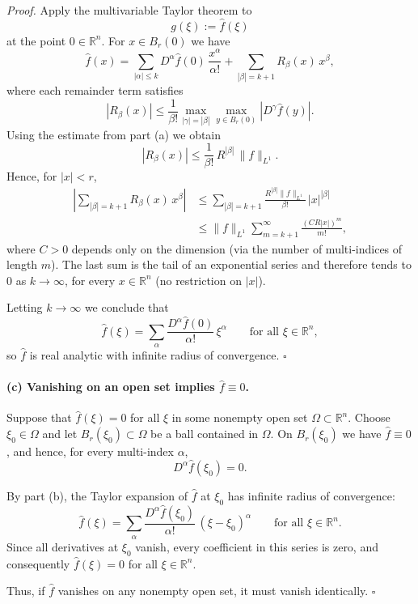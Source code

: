 \documentclass[12pt,a4paper]{article}
\newcommand{\qed}{\hfill$\square$}
\theoremstyle{plain}
\theoremstyle{definition}
\theoremstyle{remark}
\theoremstyle{remark}
\begin{document}
\emph{Proof.}
Apply the multivariable Taylor theorem to
\[
g(\xi):=\widehat f(\xi)
\]
at the point $0\in\mathbb{R}^n$. For $x\in B_r(0)$ we have
\[
\widehat f(x)
= \sum_{|\alpha|\le k} D^\alpha \widehat f(0)\,\frac{x^\alpha}{\alpha!}
+ \sum_{|\beta|=k+1} R_\beta(x)\,x^\beta,
\]
where each remainder term satisfies
\[
|R_\beta(x)|
\le \frac{1}{\beta!}
\max_{|\gamma|=|\beta|}
\max_{y\in B_r(0)} |D^\gamma \widehat f(y)|.
\]
Using the estimate from part (a) we obtain
\[
|R_\beta(x)|
\le \frac{1}{\beta!}\,R^{|\beta|}\,\|f\|_{L^1}.
\]
Hence, for $|x|<r$,
\[
\begin{aligned}
	\left|\sum_{|\beta|=k+1} R_\beta(x)\,x^\beta\right|
	&\le \sum_{|\beta|=k+1}
	\frac{R^{|\beta|}\|f\|_{L^1}}{\beta!}\,|x|^{|\beta|} \\
	&\le \|f\|_{L^1}
	\sum_{m=k+1}^\infty \frac{(C R|x|)^m}{m!},
\end{aligned}
\]
where $C>0$ depends only on the dimension (via the number of multi-indices of
length $m$). The last sum is the tail of an exponential series and therefore
tends to $0$ as $k\to\infty$, for every $x\in\mathbb{R}^n$ (no restriction on $|x|$).

Letting $k\to\infty$ we conclude that
\[
\widehat f(\xi)
= \sum_{\alpha} \frac{D^\alpha \widehat f(0)}{\alpha!}\,\xi^\alpha
\qquad\text{for all }\xi\in\mathbb{R}^n,
\]
so $\widehat f$ is real analytic with infinite radius of convergence.
\qed

\paragraph{(c) Vanishing on an open set implies $\widehat f\equiv 0$.}

Suppose that $\widehat f(\xi)=0$ for all $\xi$ in some nonempty open set
$\Omega\subset\mathbb{R}^n$. Choose $\xi_0\in\Omega$ and let $B_r(\xi_0)\subset\Omega$ be
a ball contained in $\Omega$. On $B_r(\xi_0)$ we have $\widehat f\equiv 0$, and hence,
for every multi-index $\alpha$,
\[
D^\alpha \widehat f(\xi_0)=0.
\]

By part (b), the Taylor expansion of $\widehat f$ at $\xi_0$ has infinite radius of
convergence:
\[
\widehat f(\xi)
= \sum_{\alpha} \frac{D^\alpha \widehat f(\xi_0)}{\alpha!}\,
(\xi-\xi_0)^\alpha
\qquad\text{for all }\xi\in\mathbb{R}^n.
\]
Since all derivatives at $\xi_0$ vanish, every coefficient in this series is zero,
and consequently $\widehat f(\xi)=0$ for all $\xi\in\mathbb{R}^n$.

Thus, if $\widehat f$ vanishes on any nonempty open set, it must vanish identically.
\qed
\end{document}
